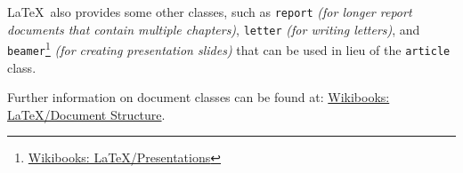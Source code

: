 \LaTeX\ also provides some other classes, such as \texttt{report} \textit{(for longer report documents that contain multiple chapters)}, \texttt{letter} \textit{(for writing letters)}, and \texttt{beamer}\footnote{\href{https://en.wikibooks.org/wiki/LaTeX/Presentations}{Wikibooks: \LaTeX{}/Presentations}} \textit{(for creating presentation slides)} that can be used in lieu of the \texttt{article} class.

Further information on document classes can be found at: \href{https://en.wikibooks.org/wiki/LaTeX/Document_Structure#Document_classes}{Wikibooks: \LaTeX{}/Document Structure}.
